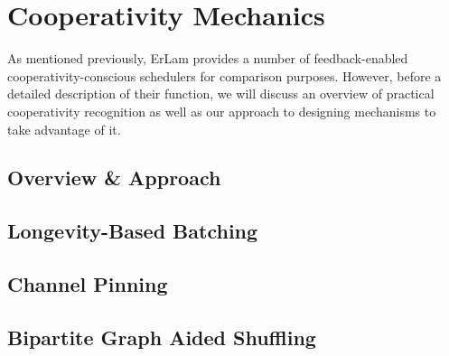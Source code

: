 \section{Cooperativity Mechanics}\label{sec:cooperativity mechanics}

As mentioned previously, ErLam provides a number of feedback-enabled 
cooperativity-conscious schedulers for comparison purposes. However, before a
detailed description of their function, we will discuss an overview of practical
cooperativity recognition as well as our approach to designing mechanisms to
take advantage of it.

\subsection{Overview \& Approach}\label{sec:cooperativity mechanics overview}




\subsection{Longevity-Based Batching}\label{sec:longevity based batching}

\subsection{Channel Pinning}\label{sec:channel pinning}

\subsection{Bipartite Graph Aided Shuffling}
    \label{sec:bipartite graph aided shuffling}


